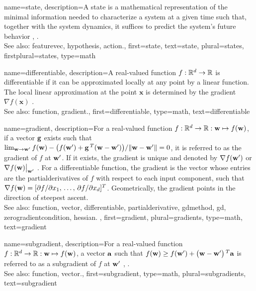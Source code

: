 {name={state},
	description={A state is a mathematical representation of the minimal 
		information needed to characterize a system at a given time 
		such that, together with the system dynamics, it suffices
		to predict the system’s future behavior \cite{SuttonEd2}, \cite{BertsekasDynOptII}. 	
		\\
		See also: \gls{featurevec}, \gls{hypothesis}, \gls{action}.},
	first={state},
	text={state}, 
	plural={states},
	firstplural={states},
	type=math
}

{name={differentiable},
	description={A real-valued \gls{function} $f: \mathbb{R}^{d} \rightarrow \mathbb{R}$ 
		is differentiable if it can be approximated locally at any point by a linear \gls{function}. 
		The local linear approximation at the point $\mathbf{x}$ is determined 
		by the \gls{gradient} $\nabla f ( \mathbf{x})$ \cite{RudinBookPrinciplesMatheAnalysis}.
					\\ 
		See also: \gls{function}, \gls{gradient}.},
	first={differentiable},
	type=math,
	text={differentiable} 
}

{name={gradient},
	description={For a real-valued \gls{function} 
		$f: \mathbb{R}^{d} \rightarrow \mathbb{R}: {\bf w} \mapsto f({\bf w})$, 
		if a \gls{vector} ${\bf g}$ exists such that 
		$\lim_{{\bf w} \rightarrow {\bf w}'} {f({\bf w}) - \big(f({\bf w}') + {\bf g}\,^{T} ({\bf w} - {\bf w}') \big) }/{\| {\bf w} - {\bf w}'\|}=0$, 
		it is referred to as the gradient of $f$ at ${\bf w}'$. If it exists, the gradient is unique and 
		denoted by $\nabla f({\bf w}')$ or $\nabla f({\bf w})\big|_{{\bf w}'}$ \cite{RudinBookPrinciplesMatheAnalysis}.
		For a \gls{differentiable} \gls{function}, the gradient is the \gls{vector} whose entries are the 
		\glspl{partialderivative} of $f$ with respect to each input component, such that 
		$\nabla f({\bf w}) = [{\partial f}/{\partial x_1}, \,\dots, \,{\partial f}/{\partial x_{d}}]^T$. 
		Geometrically, the gradient points in the direction of steepest ascent.
		\\
		See also: \gls{function}, \gls{vector}, \gls{differentiable}, \gls{partialderivative}, \gls{gdmethod}, \gls{gd}, 
		\gls{zerogradientcondition},  \gls{hessian}. },
	first={gradient},
	plural={gradients},
	type=math, 
	text={gradient}
}

{name={subgradient},
	description={For a real-valued \gls{function} $f: \mathbb{R}^{d} \rightarrow \mathbb{R}: {\bf w} \mapsto f({\bf w})$, 
		a \gls{vector} ${\bf a}$ such that $f({\bf w}) \geq  f({\bf w}') +\big({\bf w}-{\bf w}' \big)\,^{T} {\bf a}$ is 
		referred to as a subgradient of $f$ at ${\bf w}'$ \cite{BertCvxAnalOpt}, \cite{BertsekasNonLinProgr}.
		\\
		See also: \gls{function}, \gls{vector}.},
	first={subgradient},
	type=math,
	plural={subgradients},
	text={subgradient} 
}

